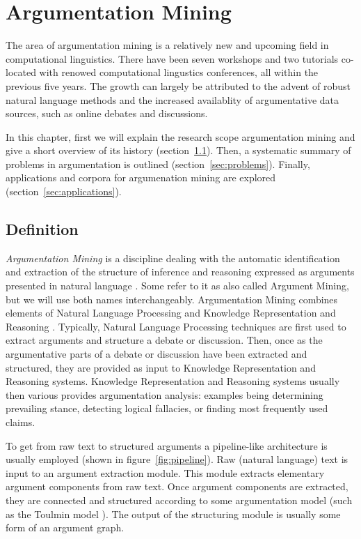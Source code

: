 \chapter{Argumentation Mining}
\label{chap:argmin}

The area of argumentation mining is a
relatively new and upcoming field in computational
linguistics. 
There have been seven workshops and two tutorials co-located with renowed
computational lingustics conferences, all within the previous five years. The
growth can largely be attributed to the advent of robust natural language
methods and the increased availablity of argumentative data sources, such as
online debates and discussions. 

In this chapter, first we will explain the research scope argumentation
mining and give a short overview of its history (section~\ref{sec:definition}).
Then, a systematic summary of problems in argumentation is outlined
(section~\ref{sec:problems}). 
Finally, applications and corpora for argumenation mining 
are explored (section~\ref{sec:applications}). 

\section{Definition}
\label{sec:definition}

\emph{Argumentation Mining} is a discipline dealing with the automatic
identification and extraction of the structure of inference and reasoning
expressed as arguments presented in natural language
\citep{lawrence2019argument}.  Some refer to it as 
also called Argument Mining, but we will use both names interchangeably. 
Argumentation Mining combines elements of Natural Language Processing and 
Knowledge Representation and Reasoning \citep{cabrio2018five}. 
Typically, Natural Language Processing techniques are first used to extract
arguments and structure a debate or discussion. Then, once as the 
argumentative parts of a debate or discussion have been extracted and
structured, they are provided as input 
to Knowledge Representation and Reasoning systems. 
Knowledge Representation and
Reasoning systems usually then various provides argumentation analysis:
examples being determining prevailing stance, detecting logical
fallacies, or finding most frequently used claims.

To get from raw text to structured arguments a pipeline-like architecture
is usually employed (shown in figure~\ref{fig:pipeline}). 
Raw (natural language) text is input to an argument extraction module. This module
extracts elementary argument components from raw text. 
Once argument components are extracted, they are connected and structured 
according to some argumentation model (such as the Toulmin model \citep{toulmin2003uses}).
The output of the structuring module is usually some form of an argument graph. 

